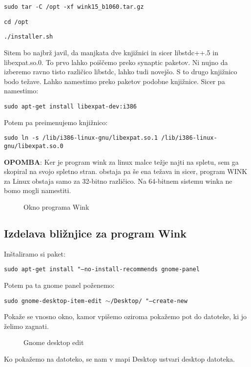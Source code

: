\documentclass[12pt,a4paper,twoside]{article}
\begin{document}
\texttt{sudo tar -C /opt -xf wink15\_b1060.tar.gz}

\texttt{cd /opt}

\texttt{./installer.sh}

Sitem bo najbrž javil, da manjkata dve knjižnici in sicer libstdc++.5 in libexpat.so.0. To prvo lahko poiščemo preko synaptic paketov. Ni nujno da izberemo ravno tisto različico libstdc, lahko tudi novejšo. S to drugo knjižnico bodo težave. Lahko namestimo preko paketov podobne knjižnice. Sicer pa namestimo:


\texttt{sudo apt-get install libexpat-dev:i386}

Potem pa preimenujemo knjižnico:

\texttt{sudo ln -s /lib/i386-linux-gnu/libexpat.so.1 /lib/i386-linux-gnu/libexpat.so.0}

\textbf{OPOMBA}: Ker je program wink za linux malce težje najti na spletu, sem ga skopiral na svojo spletno stran. obstaja pa še ena težava in sicer, program WINK za Linux obstaja samo za 32-bitno različico. Na 64-bitnem sistemu winka ne bomo mogli namestiti.



\begin{figure}[h!] \centering
{}
\caption{Okno programa Wink}\label{slika:Okno programa WInk}
\end{figure}

\subsection{Izdelava bližnjice za program Wink}

Inštaliramo si paket:

\texttt{sudo apt-get install  "--no-install-recommends gnome-panel}

Potem pa ta gnome panel poženemo:

\texttt{sudo gnome-desktop-item-edit  $\sim$/Desktop/ "--create-new}

Pokaže se vnosno okno, kamor vpišemo oziroma pokažemo pot do datoteke, ki jo želimo zagnati. 

\begin{figure}[h!] \centering
{}
\caption{Gnome desktop edit}\label{slika:Gnome desktop edit}
\end{figure}

Ko pokažemo na datoteko, se nam v mapi Desktop ustvari desktop datoteka. 
\end{document}
